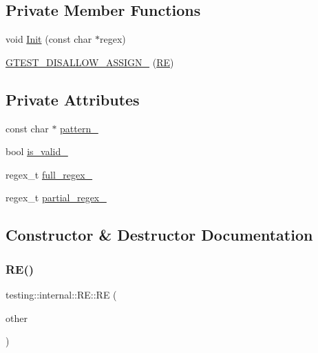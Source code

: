 \subsection*{Private Member Functions}
\begin{DoxyCompactItemize}
\item 
void \hyperlink{classtesting_1_1internal_1_1RE_a4c3a519ce849abc57d6d5fffbf1e04dc}{Init} (const char $\ast$regex)
\item 
\hyperlink{classtesting_1_1internal_1_1RE_a6a07573fee776f88fe045d067dbebe18}{G\+T\+E\+S\+T\+\_\+\+D\+I\+S\+A\+L\+L\+O\+W\+\_\+\+A\+S\+S\+I\+G\+N\+\_\+} (\hyperlink{classtesting_1_1internal_1_1RE}{RE})
\end{DoxyCompactItemize}
\subsection*{Private Attributes}
\begin{DoxyCompactItemize}
\item 
const char $\ast$ \hyperlink{classtesting_1_1internal_1_1RE_a44ab32241fab42db5b6f7482776658ec}{pattern\+\_\+}
\item 
bool \hyperlink{classtesting_1_1internal_1_1RE_af9062fefab96529ff785f50097416d64}{is\+\_\+valid\+\_\+}
\item 
regex\+\_\+t \hyperlink{classtesting_1_1internal_1_1RE_a1627cf3c6e38a83518e7aefd659b938b}{full\+\_\+regex\+\_\+}
\item 
regex\+\_\+t \hyperlink{classtesting_1_1internal_1_1RE_a1b3e42916c61db479ae90c7a96c22a58}{partial\+\_\+regex\+\_\+}
\end{DoxyCompactItemize}


\subsection{Constructor \& Destructor Documentation}
\mbox{\label{classtesting_1_1internal_1_1RE_ab215dbc2565fce641e1746ca43e9d68a}} 
\subsubsection{\texorpdfstring{R\+E()}{RE()}\hspace{0.1cm}{\footnotesize\ttfamily [1/3]}}
{\footnotesize\ttfamily testing\+::internal\+::\+R\+E\+::\+RE (\begin{DoxyParamCaption}\item[{const \hyperlink{classtesting_1_1internal_1_1RE}{RE} \&}]{other }\end{DoxyParamCaption})\hspace{0.3cm}{\ttfamily [inline]}}

